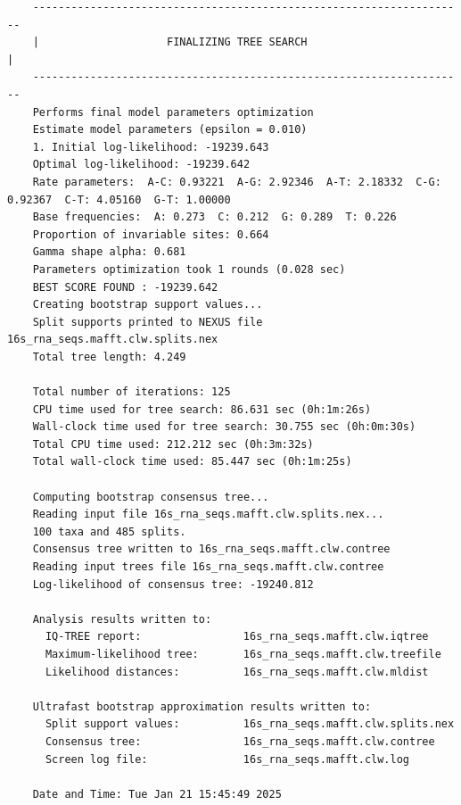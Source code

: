 \documentclass{article}
\begin{document}
\begin{verbatim}
    --------------------------------------------------------------------
    |                    FINALIZING TREE SEARCH                        |
    --------------------------------------------------------------------
    Performs final model parameters optimization
    Estimate model parameters (epsilon = 0.010)
    1. Initial log-likelihood: -19239.643
    Optimal log-likelihood: -19239.642
    Rate parameters:  A-C: 0.93221  A-G: 2.92346  A-T: 2.18332  C-G: 0.92367  C-T: 4.05160  G-T: 1.00000
    Base frequencies:  A: 0.273  C: 0.212  G: 0.289  T: 0.226
    Proportion of invariable sites: 0.664
    Gamma shape alpha: 0.681
    Parameters optimization took 1 rounds (0.028 sec)
    BEST SCORE FOUND : -19239.642
    Creating bootstrap support values...
    Split supports printed to NEXUS file 16s_rna_seqs.mafft.clw.splits.nex
    Total tree length: 4.249
    
    Total number of iterations: 125
    CPU time used for tree search: 86.631 sec (0h:1m:26s)
    Wall-clock time used for tree search: 30.755 sec (0h:0m:30s)
    Total CPU time used: 212.212 sec (0h:3m:32s)
    Total wall-clock time used: 85.447 sec (0h:1m:25s)
    
    Computing bootstrap consensus tree...
    Reading input file 16s_rna_seqs.mafft.clw.splits.nex...
    100 taxa and 485 splits.
    Consensus tree written to 16s_rna_seqs.mafft.clw.contree
    Reading input trees file 16s_rna_seqs.mafft.clw.contree
    Log-likelihood of consensus tree: -19240.812
    
    Analysis results written to: 
      IQ-TREE report:                16s_rna_seqs.mafft.clw.iqtree
      Maximum-likelihood tree:       16s_rna_seqs.mafft.clw.treefile
      Likelihood distances:          16s_rna_seqs.mafft.clw.mldist
    
    Ultrafast bootstrap approximation results written to:
      Split support values:          16s_rna_seqs.mafft.clw.splits.nex
      Consensus tree:                16s_rna_seqs.mafft.clw.contree
      Screen log file:               16s_rna_seqs.mafft.clw.log
    
    Date and Time: Tue Jan 21 15:45:49 2025
        
\end{verbatim}
\end{document}
